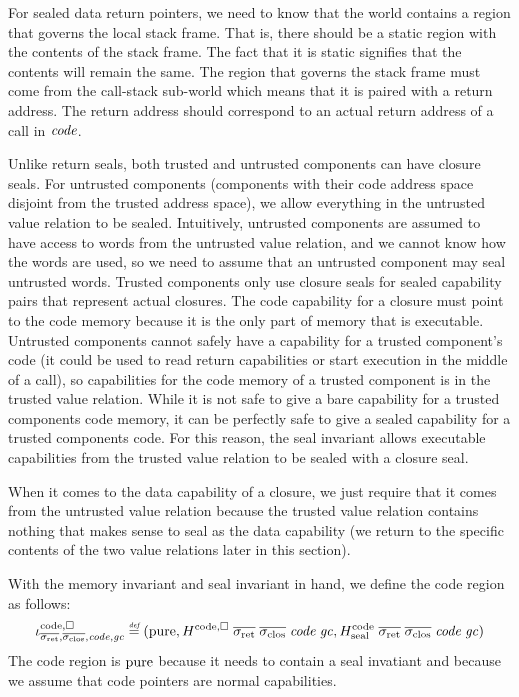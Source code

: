 \begin{jversion}
For sealed data return pointers, we need to know that the world contains a region that governs the local stack frame.
That is, there should be a static region with the contents of the stack frame.
The fact that it is static signifies that the contents will remain the same.
The region that governs the stack frame must come from the call-stack sub-world which means that it is paired with a return address.
The return address should correspond to an actual return address of a call in $\mathit{code}$.

Unlike return seals, both trusted and untrusted components can have closure seals.
For untrusted components (components with their code address space disjoint from the trusted address space), we allow everything in the untrusted value relation to be sealed.
Intuitively, untrusted components are assumed to have access to words from the untrusted value relation, and we cannot know how the words are used, so we need to assume that an untrusted component may seal untrusted words.
Trusted components only use closure seals for sealed capability pairs that represent actual closures.
The code capability for a closure must point to the code memory because it is the only part of memory that is executable.
Untrusted components cannot safely have a capability for a trusted component's code (it could be used to read return capabilities or start execution in the middle of a call), so capabilities for the code memory of a trusted component is in the trusted value relation.
While it is not safe to give a bare capability for a trusted components code memory, it can be perfectly safe to give a sealed capability for a trusted components code.
For this reason, the seal invariant allows executable capabilities from the trusted value relation to be sealed with a closure seal.

When it comes to the data capability of a closure, we just require that it comes from the untrusted value relation because the trusted value relation contains nothing that makes sense to seal as the data capability (we return to the specific contents of the two value relations later in this section).

With the memory invariant and seal invariant in hand, we define the code region as follows:
\[
  \codereg{\sigrets,\sigcloss,\code,\gc} \defeq (\pure, H^\mathrm{code,\square} \; \sigrets \; \sigcloss \; \code \; \gc, H^\mathrm{code}_{\mathrm{seal}} \; \sigrets \; \sigcloss \; \code \; \gc)
\]
The code region is $\mathrm{pure}$ because it needs to contain a seal invatiant and because we assume that code pointers are normal capabilities.


\end{jversion}
